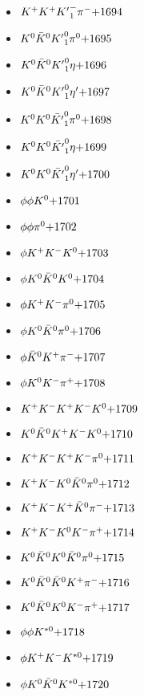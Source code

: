 \begin{multicols}{3}
\begin{itemize}
 \item $ K^{+} K^{+} {K^{\prime}}_{1}^{-} \pi^{-} \hfill{+1694}$
 \item $ K^{0} \bar{K}^{0} {K^{\prime}}_{1}^{0} \pi^{0} \hfill{+1695}$
 \item $ K^{0} \bar{K}^{0} {K^{\prime}}_{1}^{0} \eta \hfill{+1696}$
 \item $ K^{0} \bar{K}^{0} {K^{\prime}}_{1}^{0} {\eta^{\prime}} \hfill{+1697}$
 \item $ K^{0} K^{0} \bar{{K^{\prime}}}_{1}^{0} \pi^{0} \hfill{+1698}$
 \item $ K^{0} K^{0} \bar{{K^{\prime}}}_{1}^{0} \eta \hfill{+1699}$
 \item $ K^{0} K^{0} \bar{{K^{\prime}}}_{1}^{0} {\eta^{\prime}} \hfill{+1700}$
 \item $ \phi \phi K^{0} \hfill{+1701}$
 \item $ \phi \phi \pi^{0} \hfill{+1702}$
 \item $ \phi K^{+} K^{-} K^{0} \hfill{+1703}$
 \item $ \phi K^{0} \bar{K}^{0} K^{0} \hfill{+1704}$
 \item $ \phi K^{+} K^{-} \pi^{0} \hfill{+1705}$
 \item $ \phi K^{0} \bar{K}^{0} \pi^{0} \hfill{+1706}$
 \item $ \phi \bar{K}^{0} K^{+} \pi^{-} \hfill{+1707}$
 \item $ \phi K^{0} K^{-} \pi^{+} \hfill{+1708}$
 \item $ K^{+} K^{-} K^{+} K^{-} K^{0} \hfill{+1709}$
 \item $ K^{0} \bar{K}^{0} K^{+} K^{-} K^{0} \hfill{+1710}$
 \item $ K^{+} K^{-} K^{+} K^{-} \pi^{0} \hfill{+1711}$
 \item $ K^{+} K^{-} K^{0} \bar{K}^{0} \pi^{0} \hfill{+1712}$
 \item $ K^{+} K^{-} K^{+} \bar{K}^{0} \pi^{-} \hfill{+1713}$
 \item $ K^{+} K^{-} K^{0} K^{-} \pi^{+} \hfill{+1714}$
 \item $ K^{0} \bar{K}^{0} K^{0} \bar{K}^{0} \pi^{0} \hfill{+1715}$
 \item $ K^{0} \bar{K}^{0} \bar{K}^{0} K^{+} \pi^{-} \hfill{+1716}$
 \item $ K^{0} \bar{K}^{0} K^{0} K^{-} \pi^{+} \hfill{+1717}$
 \item $ \phi \phi K^{*0} \hfill{+1718}$
 \item $ \phi K^{+} K^{-} K^{*0} \hfill{+1719}$
 \item $ \phi K^{0} \bar{K}^{0} K^{*0} \hfill{+1720}$

\end{itemize}
\end{multicols}
